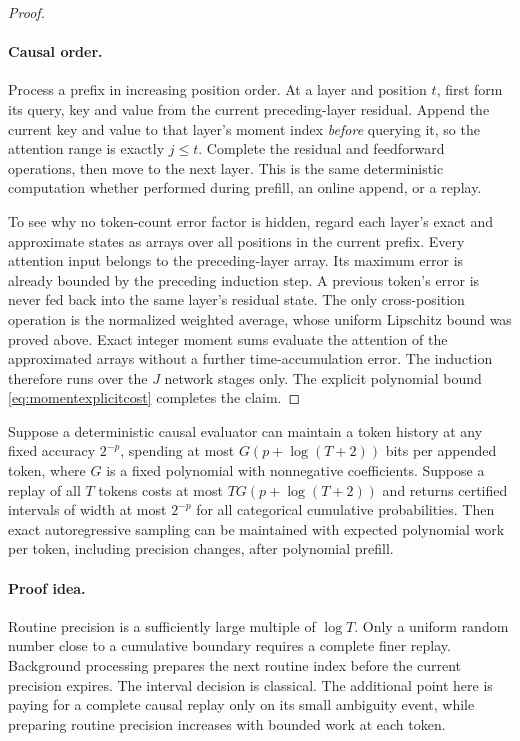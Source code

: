 \begin{proof}
\paragraph{Causal order.}
Process a prefix in increasing position order.  At a layer and
position $t$, first form its query, key and value from the current
preceding-layer residual.  Append the current key and value to
that layer's moment index \emph{before} querying it, so the
attention range is exactly $j\le t$.  Complete the residual and
feedforward operations, then move to the next layer.  This is
the same deterministic computation whether performed during
prefill, an online append, or a replay.

To see why no token-count error factor is hidden, regard each
layer's exact and approximate states as arrays over all positions
in the current prefix.  Every attention input belongs to the
preceding-layer array.  Its maximum error is already bounded by
the preceding induction step.  A previous token's error is never
fed back into the same layer's residual state.  The only
cross-position operation is the normalized weighted average,
whose uniform Lipschitz bound was proved above.  Exact integer
moment sums evaluate the attention of the approximated arrays
without a further time-accumulation error.  The induction
therefore runs over the $J$ network stages only.  The explicit
polynomial bound
\eqref{eq:momentexplicitcost} completes the claim.
\end{proof}

\begin{lemma}
\label{lem:replayexactsampling}
Suppose a deterministic causal evaluator can maintain a token
history at any fixed accuracy $2^{-p}$, spending at most
$G(p+\log(T+2))$ bits per appended token, where $G$ is a fixed
polynomial with nonnegative coefficients.  Suppose a replay of
all $T$ tokens costs at most $T G(p+\log(T+2))$ and returns
certified intervals of width at most $2^{-p}$ for all categorical
cumulative probabilities.  Then exact autoregressive sampling
can be maintained with expected polynomial work per token,
including precision changes, after polynomial prefill.
\end{lemma}

\paragraph{Proof idea.}
Routine precision is a sufficiently large multiple of $\log T$.
Only a uniform random number close to a cumulative boundary
requires a complete finer replay.  Background processing prepares
the next routine index before the current precision expires.
The interval decision is classical.  The additional point here
is paying for a complete causal replay only on its small
ambiguity event, while preparing routine precision increases
with bounded work at each token.

